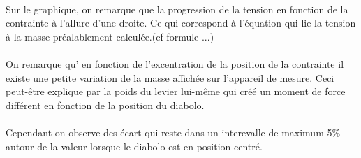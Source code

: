 \documentclass[11pt,a4paper]{report}
\begin{document}
\paragraph{} Sur le graphique, on remarque que la progression de la tension en fonction de la contrainte à l'allure d'une droite. Ce qui correspond à l'équation qui lie la tension à la masse  préalablement calculée.(cf formule ...)

\paragraph{}On remarque qu' en fonction de l'excentration de la position de la contrainte il existe une petite variation de la masse affichée sur l'appareil de mesure. Ceci peut-être explique par la poids du levier lui-même qui créé un moment de force différent en fonction de la position du diabolo. 

\paragraph{} Cependant on observe des écart qui reste dans un interevalle de maximum 5\% autour de la valeur lorsque le diabolo est en position centré.
\end{document}
